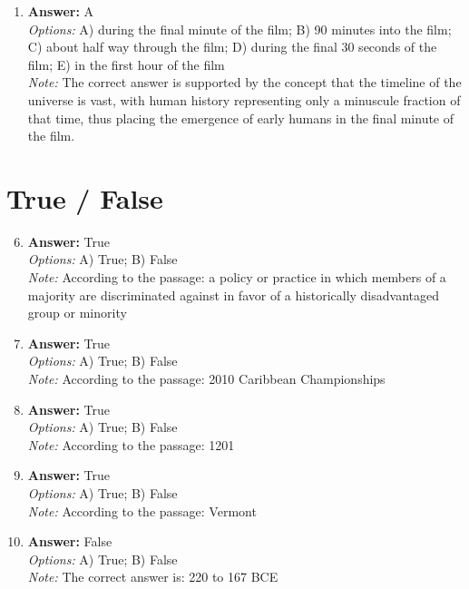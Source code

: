 \documentclass[12pt]{article}
\begin{document}
\begin{enumerate}[label=\arabic*.]
\\ \textit{Note:} Dendrochronology provides a precise and annually resolved timeline through tree-ring analysis, which helps to calibrate radiocarbon dating results by correlating carbon-14 dates with known chronological events.
\item \textbf{Answer:} A
\\ \textit{Options:} A) during the final minute of the film; B) 90 minutes into the film; C) about half way through the film; D) during the final 30 seconds of the film; E) in the first hour of the film
\\ \textit{Note:} The correct answer is supported by the concept that the timeline of the universe is vast, with human history representing only a minuscule fraction of that time, thus placing the emergence of early humans in the final minute of the film.
\end{enumerate}

\section*{True / False}
\begin{enumerate}[label=\arabic*.]
\setcounter{enumi}{5}
\item \textbf{Answer:} True
\\ \textit{Options:} A) True; B) False
\\ \textit{Note:} According to the passage: a policy or practice in which members of a majority are discriminated against in favor of a historically disadvantaged group or minority
\item \textbf{Answer:} True
\\ \textit{Options:} A) True; B) False
\\ \textit{Note:} According to the passage: 2010 Caribbean Championships
\item \textbf{Answer:} True
\\ \textit{Options:} A) True; B) False
\\ \textit{Note:} According to the passage: 1201
\item \textbf{Answer:} True
\\ \textit{Options:} A) True; B) False
\\ \textit{Note:} According to the passage: Vermont
\item \textbf{Answer:} False
\\ \textit{Options:} A) True; B) False
\\ \textit{Note:} The correct answer is: 220 to 167 BCE
\end{enumerate}
\end{document}
